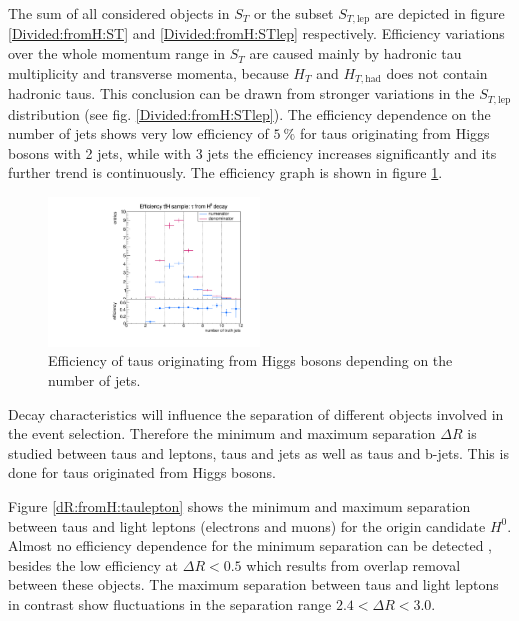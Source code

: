 %
The sum of all considered objects in $S_T$ or the subset $S_{T,\text{lep}}$ are depicted in figure \ref{Divided:fromH:ST} and \ref{Divided:fromH:STlep} respectively. Efficiency variations over the whole momentum range in $S_T$ are caused mainly by hadronic tau multiplicity and transverse momenta, because $H_T$ and $H_{T,\text{had}}$ does not contain hadronic taus. This conclusion can be drawn from stronger variations in the $S_{T,\text{lep}}$ distribution (see fig. \ref{Divided:fromH:STlep}).\newline  
The efficiency dependence on the number of jets shows very low efficiency of $\SI{5}{\percent}$ for taus originating from Higgs bosons with 2 jets, while with 3 jets the efficiency increases significantly and its further trend is continuously. The efficiency graph is shown in figure \ref{Divided:fromH:njets}.\newline
%
\begin{figure}
  \centering
                \includegraphics[width=0.5\textwidth]{figures/plots/ttH/Divided_fromHnjets.pdf}
\caption[Efficiency of taus originating from Higgs bosons depending on the number of jets.]{Efficiency of taus originating from Higgs bosons depending on the number of jets.}
\label{Divided:fromH:njets}
\end{figure}
%
Decay characteristics will influence the separation of different objects involved in the event selection. Therefore the minimum and maximum separation $\Delta R$ is studied between taus and leptons, taus and jets as well as taus and b-jets. This is done for taus originated from Higgs bosons.\par
Figure \ref{dR:fromH:taulepton} shows the minimum and maximum separation between taus and light leptons (electrons and muons) for the origin candidate $H^0$. Almost no efficiency dependence for the minimum separation can be detected , besides the low efficiency at $\Delta R<0.5$ which results from overlap removal between these objects. The maximum separation between taus and light leptons in contrast show fluctuations in the separation range $2.4<\Delta R<3.0$. \newline
